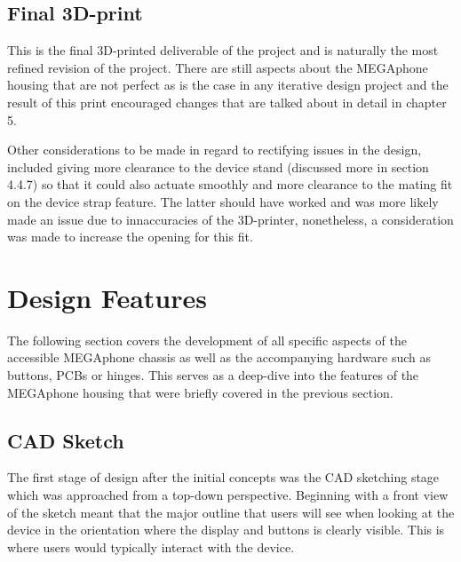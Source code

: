\subsection{Final 3D-print}

This is the final 3D-printed deliverable of the project and is naturally the most refined revision of the project. 
There are still aspects about the MEGAphone housing that are not perfect as is the case in any iterative design project and the result of this print encouraged changes that are talked about in detail in chapter 5.

Other considerations to be made in regard to rectifying issues in the design, included giving more clearance to the device stand (discussed more in section 4.4.7) so that it could also actuate smoothly and more clearance to the mating fit on the device strap feature.
The latter should have worked and was more likely made an issue due to innaccuracies of the 3D-printer, nonetheless, a consideration was made to increase the opening for this fit.

\section{Design Features}

The following section covers the development of all specific aspects of the accessible MEGAphone chassis as well as the accompanying hardware such as buttons, PCBs or hinges.
This serves as a deep-dive into the features of the MEGAphone housing that were briefly covered in the previous section.

\subsection{CAD Sketch}

The first stage of design after the initial concepts was the CAD sketching stage which was approached from a top-down perspective.
Beginning with a front view of the sketch meant that the major outline that users will see when looking at the device in the orientation where the display and buttons is clearly visible. %
This is where users would typically interact with the device.

